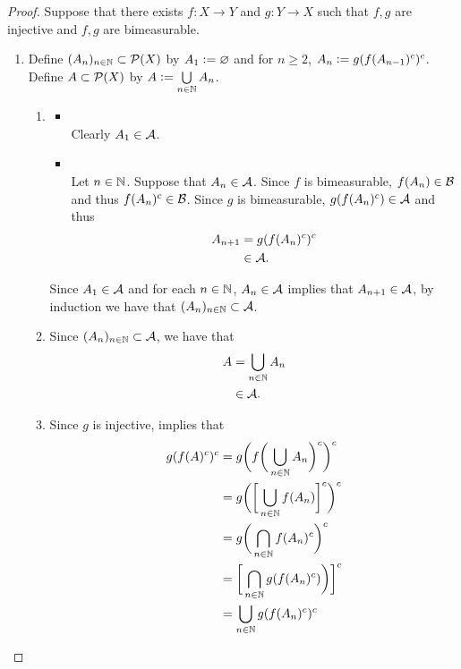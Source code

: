 \documentclass{book}
\begin{document}
	\begin{proof}
		Suppose that there exists $f:X \rightarrow Y$ and $g: Y \rightarrow X$ such that $f,g$ are injective and $f,g$ are bimeasurable. 
		\begin{enumerate}
			\item Define $(A_n)_{n \in \mathbb{N}} \subset \mathcal{P}(X)$ by $A_1 \vcentcolon= \varnothing$ and for $n \geq 2$, $A_n \vcentcolon= g(f(A_{n-1})^c)^c$. Define $A \subset \mathcal{P}(X)$ by $A \vcentcolon= \bigcup\limits_{n \in \mathbb{N}} A_n$. 
			\begin{enumerate}
				\item 
				\begin{itemize}
					\item {} \\
					Clearly $A_1 \in \mathcal{A}$. 
					\item {} \\
					Let $n \in \mathbb{N}$. Suppose that $A_n \in \mathcal{A}$. Since $f$ is bimeasurable, $f(A_n) \in \mathcal{B}$ and thus $f(A_n)^c \in \mathcal{B}$. Since $g$ is bimeasurable, $g(f(A_n)^c) \in \mathcal{A}$ and thus 
					\begin{align*}
						A_{n+1}
						& = g(f(A_n)^c)^c \\
						& \in \mathcal{A}.
					\end{align*} 
				\end{itemize}
				Since $A_1 \in \mathcal{A}$ and for each $n \in \mathbb{N}$, $A_n \in \mathcal{A}$ implies that $A_{n+1} \in \mathcal{A}$, by induction we have that $(A_n)_{n \in \mathbb{N}} \subset \mathcal{A}$. 
				\item Since $(A_n)_{n \in \mathbb{N}} \subset \mathcal{A}$, we have that 
				\begin{align*}
					A
					& = \bigcup_{n \in \mathbb{N}} A_n \\
					& \in \mathcal{A}. 
				\end{align*}
				\item Since $g$ is injective,  implies that 
				\begin{align*}
					g(f(A)^c)^c
					& = g \bigg( f \bigg( \bigcup\limits_{n \in \N} A_n \bigg)^c \bigg)^c \\
					& = g \bigg( \bigg[ \bigcup\limits_{n \in \N} f(A_n) \bigg]^c \bigg)^c \\
					& = g\bigg( \bigcap\limits_{n \in \N} f(A_n)^c  \bigg)^c \\
					& = \bigg[ \bigcap\limits_{n \in \N} g(f(A_n)^c)  \bigg) \bigg]^c \\
					& = \bigcup\limits_{n \in \N} g(f(A_n)^c)^c \\

\end{align*}
\end{enumerate}
\end{enumerate}
\end{proof}
\end{document}
